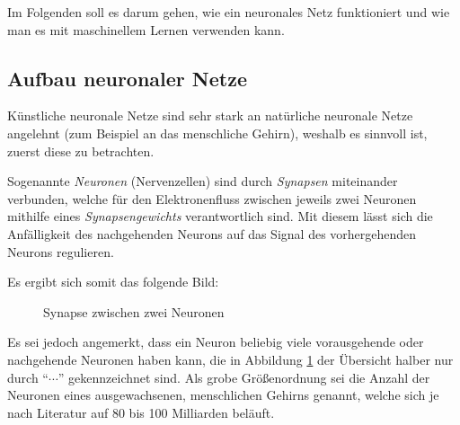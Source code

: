 \documentclass[12pt,a4]{article}
\begin{document}
Im Folgenden soll es darum gehen, wie ein neuronales Netz funktioniert und wie man es mit maschinellem Lernen verwenden kann.

\subsection{Aufbau neuronaler Netze \cite{NeuronaleNetzeImKlartext}}\label{sec:BasicStructure}
Künstliche neuronale Netze sind sehr stark an natürliche neuronale Netze angelehnt (zum Beispiel an das menschliche Gehirn), weshalb es sinnvoll ist, zuerst diese zu betrachten.

Sogenannte \textit{Neuronen} (Nervenzellen) sind durch \textit{Synapsen} miteinander verbunden, welche für den Elektronenfluss zwischen jeweils zwei Neuronen mithilfe eines \textit{Synapsengewichts} verantwortlich sind. Mit diesem lässt sich die Anfälligkeit des nachgehenden Neurons auf das Signal des  vorhergehenden Neurons regulieren. \cite{Synapsengewicht}

Es ergibt sich somit das folgende Bild:
\begin{figure}[!h]
\centering
{}
\caption{Synapse zwischen zwei Neuronen}
\label{fig:Neuronenverbindung}
\end{figure}

Es sei jedoch angemerkt, dass ein Neuron beliebig viele vorausgehende oder nachgehende Neuronen haben kann, die in Abbildung \ref{fig:Neuronenverbindung} der Übersicht halber nur durch \enquote{$\cdots$} gekennzeichnet sind. Als grobe Größenordnung sei die Anzahl der Neuronen eines ausgewachsenen, menschlichen Gehirns genannt, welche sich je nach Literatur auf 80 bis 100 Milliarden beläuft.
\end{document}
